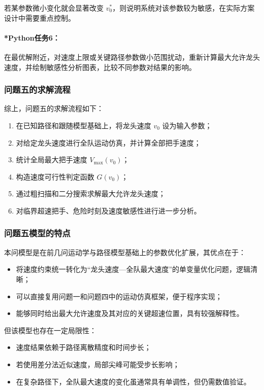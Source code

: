 \documentclass[12pt,a4paper]{ctexart}
\begin{document}
若某参数微小变化就会显著改变 $v_0^\ast$，则说明系统对该参数较为敏感，在实际方案设计中需要重点控制。

\paragraph{*Python任务6：}
在最优解附近，对速度上限或关键路径参数做小范围扰动，重新计算最大允许龙头速度，并绘制敏感性分析图表，比较不同参数对结果的影响。

\subsubsection{问题五的求解流程}
综上，问题五的求解流程如下：

\begin{enumerate}
    \item 在已知路径和跟随模型基础上，将龙头速度 $v_0$ 设为输入参数；
    \item 对给定龙头速度进行全队运动仿真，并计算全部把手速度；
    \item 统计全局最大把手速度 $V_{\max}(v_0)$；
    \item 构造速度可行性判定函数 $G(v_0)$；
    \item 通过粗扫描和二分搜索求解最大允许龙头速度；
    \item 对临界超速把手、危险时刻及速度敏感性进行进一步分析。
\end{enumerate}

\subsubsection{问题五模型的特点}
本问模型是在前几问运动学与路径模型基础上的参数优化扩展，其优点在于：

\begin{itemize}
    \item 将速度约束统一转化为“龙头速度—全队最大速度”的单变量优化问题，逻辑清晰；
    \item 可以直接复用问题一和问题四中的运动仿真框架，便于程序实现；
    \item 能够同时给出最大允许速度及其对应的关键超速位置，具有较强解释性。
\end{itemize}

但该模型也存在一定局限性：

\begin{itemize}
    \item 速度结果依赖于路径离散精度和时间步长；
    \item 若使用差分法近似速度，局部尖峰可能受步长影响；
    \item 在复杂路径下，全队最大速度的变化虽通常具有单调性，但仍需数值验证。
\end{itemize}
\end{document}
